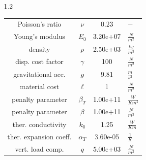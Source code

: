 \documentclass[preview]{standalone}
\begin{document}
\begin{spacing}{1.2}
\begin{tabular}{cccl}
\toprule
Poisson's ratio & $\nu$ & 0.23 & $-$ \\ 
Young's modulus & $E_{0}$ & 3.20e+07 & $\frac{N}{m^2}$ \\ 
density & $\rho$ & 2.50e+03 & $\frac{kg}{m^3}$ \\ 
disp. cost factor & $\gamma$ & 100 & $\frac{N}{m^2}$ \\ 
gravitational acc. & $g$ & 9.81 & $\frac{m}{s^2}$ \\ 
material cost & $\ell$ & 1 & $\frac{N}{m^2}$ \\ 
penalty parameter & $\beta_{T}$ & 1.00e+11 & $\frac{W}{K m^2}$ \\ 
penalty parameter & $\beta$ & 1.00e+11 & $\frac{N}{m^3}$ \\ 
ther. conductivity & $k_{0}$ & 1.25 & $\frac{W}{K m}$ \\ 
ther. expansion coeff. & $\alpha_{T}$ & 3.60e-05 & $\frac{1}{K}$ \\ 
vert. load comp. & $q$ & 5.00e+03 & $\frac{N}{m^2}$ \\ 
\bottomrule
\end{tabular}
\end{spacing}
\end{document}

